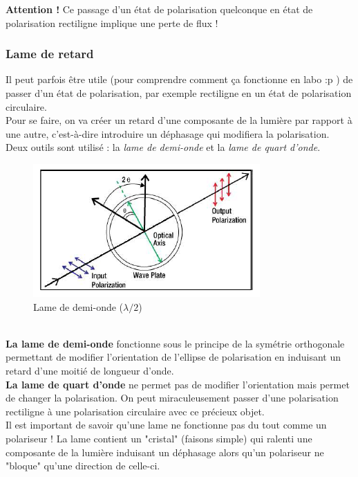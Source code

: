 \documentclass	[11pt, a4paper, openany]{book}
\begin{document}
\textbf{Attention !} Ce passage d'un état de polarisation quelconque en état de polarisation rectiligne implique une perte de flux !

\subsubsection*{Lame de retard}
Il peut parfois être utile (pour comprendre comment ça fonctionne en labo :p ) de passer d'un état de polarisation, par exemple rectiligne en un état de polarisation circulaire.\\
Pour se faire, on va créer un retard d'une composante de la lumière par rapport à une autre, c'est-à-dire introduire un déphasage qui modifiera la polarisation. Deux outils sont utilisé : la \textit{lame de demi-onde} et la \textit{lame de quart d'onde}.
\begin{figure}[h]
\begin{center}
\includegraphics[scale=0.5]{labo/image4.png}
\end{center}
\caption{Lame de demi-onde ($\lambda/2$)}
\label{lamedemo}
\end{figure}\  \\

\textbf{La lame de demi-onde} fonctionne sous le principe de la symétrie orthogonale permettant de modifier l'orientation de l'ellipse de polarisation en induisant un retard d'une moitié de longueur d'onde.\\

\textbf{La lame de quart d'onde} ne permet pas de modifier l'orientation mais permet de changer la polarisation. On peut miraculeusement passer d'une polarisation rectiligne à une polarisation circulaire avec ce précieux objet.\\

Il est important de savoir qu'une lame ne fonctionne pas du tout comme un polariseur ! La lame contient un "cristal" (faisons simple) qui ralenti une composante de la lumière induisant un déphasage alors qu'un polariseur ne "bloque" qu'une direction de celle-ci.
\end{document}
